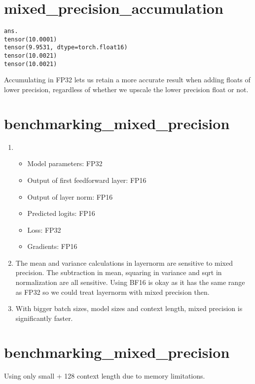 \documentclass{article}
\begin{document}
\newpage
\section{mixed\_precision\_accumulation}

\begin{lstlisting}
ans. 
tensor(10.0001)
tensor(9.9531, dtype=torch.float16)
tensor(10.0021)
tensor(10.0021)
\end{lstlisting}

Accumulating in FP32 lets us retain a more accurate result when adding floats of lower precision, regardless of whether we upscale the lower precision float or not.

\newpage
\section{benchmarking\_mixed\_precision}

\begin{enumerate}
\item
\begin{itemize}
  \item Model parameters: FP32
  \item Output of first feedforward layer: FP16
  \item Output of layer norm: FP16
  \item Predicted logits: FP16
  \item Loss: FP32
  \item Gradients: FP16
\end{itemize}

\item
The mean and variance calculations in layernorm are sensitive to mixed precision.
The subtraction in mean, squaring in variance and sqrt in normalization are all sensitive.
Using BF16 is okay as it has the same range as FP32 so we could treat layernorm with mixed precision then.


\item
With bigger batch sizes, model sizes and context length, mixed precision is significantly faster.
\end{enumerate}

\newpage
\section{benchmarking\_mixed\_precision}
Using only small + 128 context length due to memory limitations.
\end{document}
